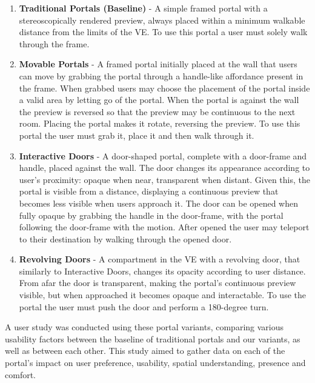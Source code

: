 \begin{enumerate}
    \item \textbf{Traditional Portals (Baseline)} - A simple framed portal with a stereoscopically rendered preview, always placed within a minimum 
    walkable distance from the limits of the \gls{VE}. To use this portal a user must solely walk through the frame.
    
    \item \textbf{Movable Portals} - A framed portal initially placed at the wall that users can move by grabbing the portal through a handle-like
    affordance present in the frame. When grabbed users may choose the placement of the portal inside a valid area by letting go of the portal. 
    When the portal is against the wall the preview is reversed so that the preview may be continuous to the next room. Placing the portal makes 
    it rotate, reversing the preview. To use this portal the user must grab it, place it and then walk through it.
    
    \item \textbf{Interactive Doors} - A door-shaped portal, complete with a door-frame and handle, placed against the wall. The door changes its 
    appearance according to user's proximity: opaque when near, transparent when distant. Given this, the portal is visible from a distance, displaying a
    continuous preview that becomes less visible when users approach it. The door can be opened when fully opaque by grabbing the handle in the door-frame, 
    with the portal following the door-frame with the motion. After opened the user may teleport to their destination by walking through the opened door.
     
    \item \textbf{Revolving Doors} - A compartment in the \gls{VE} with a revolving door, that similarly to Interactive Doors, changes its opacity 
    according to user distance. From afar the door is transparent, making the portal's continuous preview visible, but when approached it becomes 
    opaque and interactable. To use the portal the user must push the door and perform a 180-degree turn.
\end{enumerate}

A user study was conducted using these portal variants, comparing various usability factors between the baseline of traditional portals and our variants, 
as well as between each other. This study aimed to gather data on each of the portal's impact on user preference, usability, spatial understanding,
presence and comfort. 

